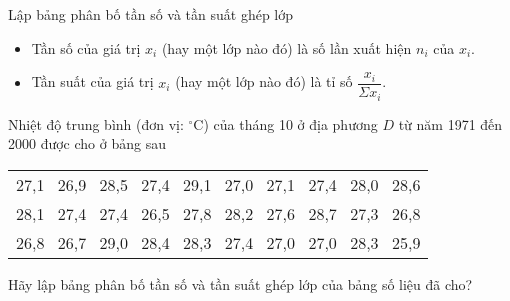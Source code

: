 \begin{dang}{Lập bảng phân bố tần số và tần suất ghép lớp}
\begin{itemize}
\item Tần số của giá trị $x_i$ (hay một lớp nào đó) là số lần xuất hiện $n_i$ của $x_i$.
\item Tần suất của giá trị $x_i$ (hay một lớp nào đó) là tỉ số $\dfrac{x_i}{\Sigma x_i}$.
\end{itemize}
\end{dang}
\begin{vd}%
Nhiệt độ trung bình (đơn vị: $^\circ$C) của tháng 10 ở địa phương $D$ từ năm 1971 đến 2000 được cho ở bảng sau
\begin{center}
\begin{tabular}{|c|}
\hline
27,1 \, 26,9 \, 28,5 \, 27,4 \, 29,1 \, 27,0 \, 27,1 \, 27,4 \, 28,0 \, 28,6\\
28,1 \, 27,4 \, 27,4 \, 26,5 \, 27,8 \, 28,2 \, 27,6 \, 28,7 \, 27,3 \, 26,8\\
26,8 \, 26,7 \, 29,0 \, 28,4 \, 28,3 \, 27,4 \, 27,0 \, 27,0 \, 28,3 \, 25,9\\
\hline
\end{tabular}
\end{center}
Hãy lập bảng phân bố tần số và tần suất ghép lớp của bảng số liệu đã cho?
\loigiai{
Bảng phân bố tần số và tần suất ghép lớp được tính như trong bảng sau:
\begin{center}
\begin{tabular}{|c|c|c|}
\hline 
\bf Lớp & \bf Tần số & \bf Tần suất (\%) \\
\hline 
$[25; 27)$ & $6$   & $20$ \\ 
$[27; 29)$ & $22$ & $73.33$ \\ 
$[29; 31]$ & $2$   & $6.67$ \\ 
\hline 
Cộng& $n=30$ & 100 \\
\hline 
\end{tabular}
\end{center}
}
\end{vd}

